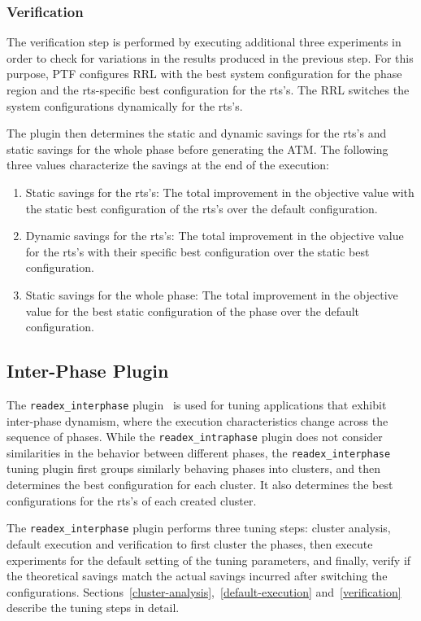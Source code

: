 \subsubsection{Verification} \label{intra-verification} 

The verification step is performed by executing additional three experiments in order to check for variations in the results produced in the previous step. For this purpose, PTF configures RRL with the best system configuration for the phase region and the rts-specific best configuration for the rts's. The RRL switches the system configurations dynamically for the rts's.

The plugin then determines the static and dynamic savings for the rts's and static savings for the whole phase before generating the ATM. The following three values characterize the savings at the end of the execution:

\begin{enumerate}
	\item Static savings for the rts's: The total improvement in the objective value with the static best configuration of the rts's over the default configuration. 
	\item Dynamic savings for the rts's: The total improvement in the objective value for the rts's with their specific best configuration over the static best configuration.
	\item Static savings for the whole phase: The total improvement in the objective value for the best static configuration of the phase over the default configuration.
\end{enumerate}


\subsection{Inter-Phase Plugin} \label{sec:inter-phase}

The \texttt{readex\_interphase} plugin~\cite{PDPTA_18_Kumaraswamy} is used for tuning applications that exhibit inter-phase dynamism, where the execution characteristics change across the sequence of phases. While the \texttt{readex\_intraphase} plugin does not consider similarities in the behavior between different phases, the \texttt{readex\_interphase} tuning plugin first groups similarly behaving phases into clusters, and then determines the best configuration for each cluster. It also determines the best configurations for the rts's of each created cluster.

The \texttt{readex\_interphase} plugin performs three tuning steps: cluster analysis, default execution and verification to first cluster the phases, then execute experiments for the default setting of the tuning parameters, and finally, verify if the theoretical savings match the actual savings incurred after switching the configurations. Sections~\ref{cluster-analysis},~\ref{default-execution} and~\ref{verification} describe the tuning steps in detail.

